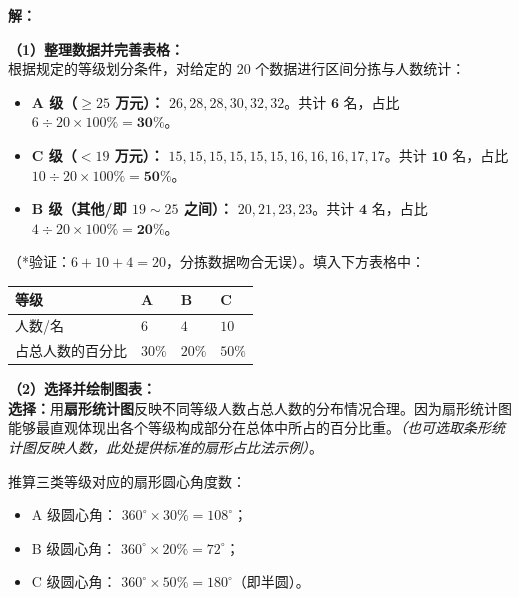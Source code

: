 \vspace{0.4cm}

\textbf{解：}

\textbf{（1）整理数据并完善表格：} \\
根据规定的等级划分条件，对给定的 $20$ 个数据进行区间分拣与人数统计：
\begin{itemize}
  \item \textbf{A 级（$\geqslant 25$ 万元）：} $26, 28, 28, 30, 32, 32$。共计 $\boldsymbol{6}$ 名，占比 $6 \div 20 \times 100\% = \boldsymbol{30\%}$。
  \item \textbf{C 级（$< 19$ 万元）：} $15, 15, 15, 15, 15, 15, 16, 16, 16, 17, 17$。共计 $\boldsymbol{10}$ 名，占比 $10 \div 20 \times 100\% = \boldsymbol{50\%}$。
  \item \textbf{B 级（其他/即 $19 \sim 25$ 之间）：} $20, 21, 23, 23$。共计 $\boldsymbol{4}$ 名，占比 $4 \div 20 \times 100\% = \boldsymbol{20\%}$。
\end{itemize}

（*验证：$6+10+4=20$，分拣数据吻合无误）。填入下方表格中：

\vspace{0.2cm}
\begin{center}
\renewcommand{\arraystretch}{1.5}
\begin{tabular}{|>{\centering\arraybackslash}p{3.4cm}|>{\centering\arraybackslash}p{3.4cm}|>{\centering\arraybackslash}p{3.4cm}|>{\centering\arraybackslash}p{3.4cm}|}
  \hline
  \cellcolor{gray!15} 等级 & A & B & C \\
  \hline
  \cellcolor{gray!15} 人数/名 & \textbf{$6$} & \textbf{$4$} & \textbf{$10$} \\
  \hline
  \cellcolor{gray!15} 占总人数的百分比 & \textbf{$30\%$} & \textbf{$20\%$} & \textbf{$50\%$} \\
  \hline
\end{tabular}
\end{center}
\vspace{0.4cm}

\textbf{（2）选择并绘制图表：} \\
\textbf{选择：}用\textbf{扇形统计图}反映不同等级人数占总人数的分布情况合理。因为扇形统计图能够最直观体现出各个等级构成部分在总体中所占的百分比重。\textit{（也可选取条形统计图反映人数，此处提供标准的扇形占比法示例）}。

推算三类等级对应的扇形圆心角度数：
\begin{itemize}
  \item A 级圆心角： $360^\circ \times 30\% = 108^\circ$；
  \item B 级圆心角： $360^\circ \times 20\% = 72^\circ$；
  \item C 级圆心角： $360^\circ \times 50\% = 180^\circ$（即半圆）。
\end{itemize}

